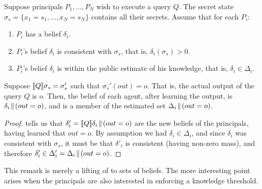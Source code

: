 \documentclass[10pt]{sigplanconf}
\newcommand{\pxm}[1]{\textcolor{red}{PM -- #1}}
\newcommand{\pxm}[1]{}
\begin{document}
\begin{remark}
\label{rem:sound-sets}
Suppose principals $P_1, ..., P_N$ wish to execute a query $Q$.  The
secret state $\sigma_s = \{ x_1 = s_1, ..., x_N = s_N \}$ contains all
their secrets.  Assume that for each $P_i$:
\begin{enumerate}
\item $ P_i $ has a belief $ \delta_i $.
\item $ P_i $'s belief $ \delta_i $ is consistent with $ \sigma_s $, that is,
$\delta_i(\sigma_s) > 0 $.
\item $ P_i $'s belief $ \delta_i $ is within the public estimate of
his knowledge, that is, $\delta_i \in \Delta_i$.
\end{enumerate}
Suppose $[\![{Q}]\!]{\sigma_s} = \sigma_s'$ such that $\sigma_s'(out) =
o$. That is, the actual output of the query $Q$ is
$o$. Then, the belief of each agent, after learning the output, is
$ \delta_i\!\parallel\!{(out = o)} $, and is a member of the estimated set
$ \Delta_i\!\parallel\!{(out = o)} $.
\end{remark}

\begin{proof}
 tells us that $\delta_i' =
[\![{Q}]\!]{\delta_i}\!\parallel\!{(out = o)}$ are the new beliefs of the
principals, having learned that $ out = o $. By assumption we had
$ \delta_i \in \Delta_i $, and since $ \delta_i $ was consistent with
$ \sigma_s $, it must be that $ \delta'_i $ is consistent (having
non-zero mass), and therefore $ \delta'_i \in \Delta'_i
= \Delta_i\!\parallel\!{(out = o)}$.
\end{proof}

This remark is merely a lifting of  to
sets of beliefs. The more interesting point arises when the principals
are also interested in enforcing a knowledge threshold.
\end{document}

